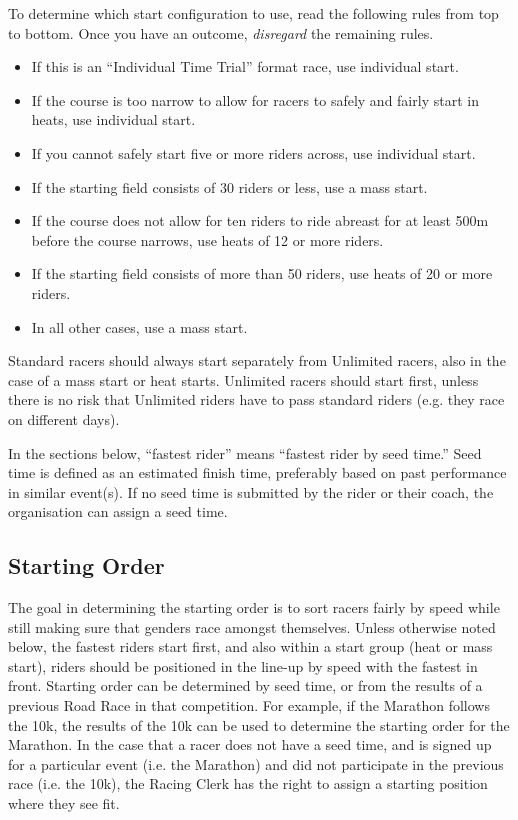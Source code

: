 To determine which start configuration to use, read the following rules from top to bottom.
Once you have an outcome, \textit{disregard} the remaining rules.
\begin{itemize}
\item If this is an ``Individual Time Trial'' format race, use individual start.
\item If the course is too narrow to allow for racers to safely and fairly start in heats, use individual start.
\item If you cannot safely start five or more riders across, use individual start.
\item If the starting field consists of 30 riders or less, use a mass start.
\item If the course does not allow for ten riders to ride abreast for at least 500m before the course narrows, use heats of 12 or more riders.
\item If the starting field consists of more than 50 riders, use heats of 20 or more riders.
\item In all other cases, use a mass start.
\end{itemize}
Standard racers should always start separately from Unlimited racers, also in the case of a mass start or heat starts.
Unlimited racers should start first, unless there is no risk that Unlimited riders have to pass standard riders (e.g. they race on different days).

In the sections below, ``fastest rider'' means ``fastest rider by seed time.'' Seed time is defined as an estimated finish time, preferably based on past performance in similar event(s).
If no seed time is submitted by the rider or their coach, the organisation can assign a seed time.

\subsection{Starting Order}
The goal in determining the starting order is to sort racers fairly by speed while still making sure that genders race amongst themselves.
Unless otherwise noted below, the fastest riders start first, and also within a start group (heat or mass start), riders should be positioned in the line-up by speed with the fastest in front.
Starting order can be determined by seed time, or from the results of a previous Road Race in that competition.
For example, if the Marathon follows the 10k, the results of the 10k can be used to determine the starting order for the Marathon.
In the case that a racer does not have a seed time, and is signed up for a particular event (i.e. the Marathon) and did not participate in the previous race (i.e. the 10k), the Racing Clerk has the right to assign a starting position where they see fit.

